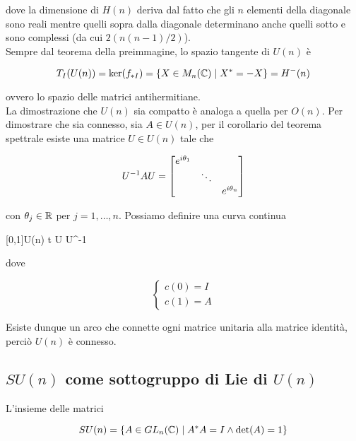 dove la dimensione di $ H(n) $ deriva dal fatto che gli $ n $ elementi della diagonale sono reali mentre quelli sopra dalla diagonale determinano anche quelli sotto e sono complessi (da cui $ 2 (n(n-1)/2) $).\\
Sempre dal teorema della preimmagine, lo spazio tangente di $ U(n) $ è

\begin{equation}
	T_{I}(U(n)) = \ker(f_{*I}) = \{ X \in M_{n}(\mathbb{C}) \mid X^{*} = -X \} = H^{-}(n)
\end{equation}

ovvero lo spazio delle matrici antihermitiane.\\
La dimostrazione che $ U(n) $ sia compatto è analoga a quella per $ O(n) $. Per dimostrare che sia connesso, sia $ A \in U(n) $, per il corollario del teorema spettrale esiste una matrice $ U \in U(n) $ tale che

\begin{equation}
	U^{-1} A U = %
	\bmqty{ %
			\dmat{ %
					e^{i \theta_{1}}, %
					\ddots, %
					e^{i \theta_{n}} %
					} %
			}
\end{equation}

con $ \theta_{j} \in \mathbb{R} $ per $ j=1,\dots,n $. Possiamo definire una curva continua

	{[0,1]}{U(n)}
	{t}{ %
			U  U^{-1} %
			}

dove

\begin{equation}
	\begin{cases}
		c(0) = I\\
		c(1) = A
	\end{cases}
\end{equation}

Esiste dunque un arco che connette ogni matrice unitaria alla matrice identità, perciò $ U(n) $ è connesso.

\subsection{$ SU(n) $ come sottogruppo di Lie di $ U(n) $}

L'insieme delle matrici

\begin{equation}
	SU(n) = \{ A \in GL_{n}(\mathbb{C}) \mid A^{*} A = I \wedge \det(A) = 1 \}
\end{equation}

